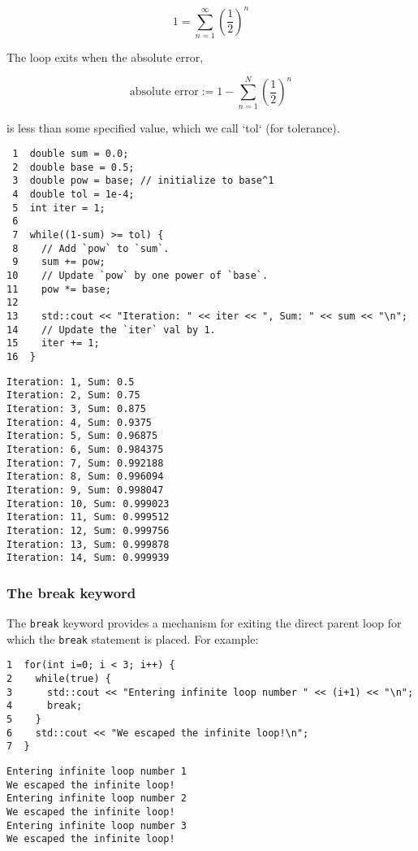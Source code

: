 \documentclass[11pt]{article}
\begin{document}
$$
1 = \sum_{n=1}^{\infty} \left(\frac{1}{2}\right)^n
$$

The loop exits when the absolute error, 

$$
    \text{absolute error} := 1-\sum_{n=1}^N  \left(\frac{1}{2}\right)^n
$$

is less than some specified value, which we call `tol` (for tolerance).

\begin{verbatim}
 1  double sum = 0.0;
 2  double base = 0.5;
 3  double pow = base; // initialize to base^1
 4  double tol = 1e-4;
 5  int iter = 1;
 6  
 7  while((1-sum) >= tol) {
 8    // Add `pow` to `sum`.
 9    sum += pow;
10    // Update `pow` by one power of `base`.
11    pow *= base;
12  
13    std::cout << "Iteration: " << iter << ", Sum: " << sum << "\n";
14    // Update the `iter` val by 1.
15    iter += 1;
16  }
\end{verbatim}

\begin{verbatim}
Iteration: 1, Sum: 0.5
Iteration: 2, Sum: 0.75
Iteration: 3, Sum: 0.875
Iteration: 4, Sum: 0.9375
Iteration: 5, Sum: 0.96875
Iteration: 6, Sum: 0.984375
Iteration: 7, Sum: 0.992188
Iteration: 8, Sum: 0.996094
Iteration: 9, Sum: 0.998047
Iteration: 10, Sum: 0.999023
Iteration: 11, Sum: 0.999512
Iteration: 12, Sum: 0.999756
Iteration: 13, Sum: 0.999878
Iteration: 14, Sum: 0.999939
\end{verbatim}

\subsubsection{The break keyword}
\label{sec-4-2-3}
The \texttt{break} keyword provides a mechanism for exiting the direct parent loop
for which the \texttt{break} statement is placed. For example:

\begin{verbatim}
1  for(int i=0; i < 3; i++) {
2    while(true) {
3      std::cout << "Entering infinite loop number " << (i+1) << "\n";
4      break;
5    }
6    std::cout << "We escaped the infinite loop!\n";
7  }
\end{verbatim}

\begin{verbatim}
Entering infinite loop number 1
We escaped the infinite loop!
Entering infinite loop number 2
We escaped the infinite loop!
Entering infinite loop number 3
We escaped the infinite loop!
\end{verbatim}
\end{document}
